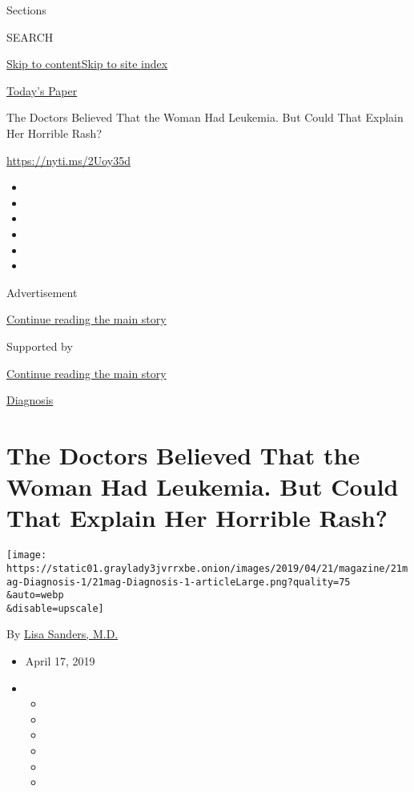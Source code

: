Sections

SEARCH

\protect\hyperlink{site-content}{Skip to
content}\protect\hyperlink{site-index}{Skip to site index}

\href{https://myaccount.nytimes3xbfgragh.onion/auth/login?response_type=cookie\&client_id=vi}{}

\href{https://www.nytimes3xbfgragh.onion/section/todayspaper}{Today's
Paper}

The Doctors Believed That the Woman Had Leukemia. But Could That Explain
Her Horrible Rash?

\url{https://nyti.ms/2Uoy35d}

\begin{itemize}
\item
\item
\item
\item
\item
\item
\end{itemize}

Advertisement

\protect\hyperlink{after-top}{Continue reading the main story}

Supported by

\protect\hyperlink{after-sponsor}{Continue reading the main story}

\href{/column/diagnosis}{Diagnosis}

\hypertarget{the-doctors-believed-that-the-woman-had-leukemia-but-could-that-explain-her-horrible-rash}{%
\section{The Doctors Believed That the Woman Had Leukemia. But Could
That Explain Her Horrible
Rash?}\label{the-doctors-believed-that-the-woman-had-leukemia-but-could-that-explain-her-horrible-rash}}

\texttt{[image: https://static01.graylady3jvrrxbe.onion/images/2019/04/21/magazine/21mag-Diagnosis-1/21mag-Diagnosis-1-articleLarge.png?quality=75\\\&auto=webp\\\&disable=upscale]}

By \href{https://www.nytimes3xbfgragh.onion/by/lisa-sanders-md}{Lisa
Sanders, M.D.}

\begin{itemize}
\item
  April 17, 2019
\item
  \begin{itemize}
  \item
  \item
  \item
  \item
  \item
  \item
  \end{itemize}
\end{itemize}

